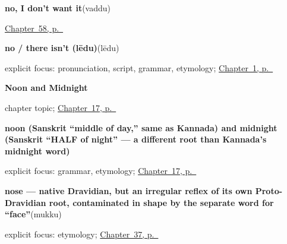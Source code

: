 \noindent\begin{minipage}[t]{\linewidth}
\raggedright
\textbf{no, I don't want it}\enspace\emph{}\enspace(vaddu)\par
\footnotesize \hyperref[ch:te-more-replies]{Chapter~58, p.~\pageref*{ch:te-more-replies}}
\end{minipage}\par\smallskip

\noindent\begin{minipage}[t]{\linewidth}
\raggedright
\textbf{no / there isn't (lēdu)}\enspace\emph{}\enspace(lēdu)\par
\footnotesize explicit focus: pronunciation, script, grammar, etymology; \hyperref[ch:greetings]{Chapter~1, p.~\pageref*{ch:greetings}}
\end{minipage}\par\smallskip

\noindent\begin{minipage}[t]{\linewidth}
\raggedright
\textbf{Noon and Midnight}\par
\footnotesize chapter topic; \hyperref[ch:te-noon-and-midnight]{Chapter~17, p.~\pageref*{ch:te-noon-and-midnight}}
\end{minipage}\par\smallskip

\noindent\begin{minipage}[t]{\linewidth}
\raggedright
\textbf{noon (Sanskrit \textquotedblleft{}middle of day,\textquotedblright{} same as Kannada) and midnight (Sanskrit \textquotedblleft{}HALF of night\textquotedblright{} — a different root than Kannada's midnight word)}\enspace\emph{ }\par
\footnotesize explicit focus: grammar, etymology; \hyperref[ch:te-noon-and-midnight]{Chapter~17, p.~\pageref*{ch:te-noon-and-midnight}}
\end{minipage}\par\smallskip

\noindent\begin{minipage}[t]{\linewidth}
\raggedright
\textbf{nose — native Dravidian, but an irregular reflex of its own Proto-Dravidian root, contaminated in shape by the separate word for \textquotedblleft{}face\textquotedblright{}}\enspace\emph{}\enspace(mukku)\par
\footnotesize explicit focus: etymology; \hyperref[ch:te-face-words]{Chapter~37, p.~\pageref*{ch:te-face-words}}
\end{minipage}\par\smallskip

